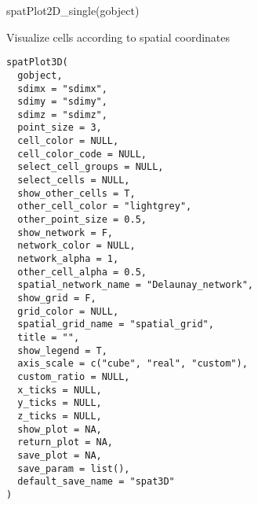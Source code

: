 \documentclass[a4paper]{book}
\begin{document}
%
\begin{Examples}
\begin{ExampleCode}
    spatPlot2D_single(gobject)
\end{ExampleCode}
\end{Examples}
%
\begin{Description}\relax
Visualize cells according to spatial coordinates
\end{Description}
%
\begin{Usage}
\begin{verbatim}
spatPlot3D(
  gobject,
  sdimx = "sdimx",
  sdimy = "sdimy",
  sdimz = "sdimz",
  point_size = 3,
  cell_color = NULL,
  cell_color_code = NULL,
  select_cell_groups = NULL,
  select_cells = NULL,
  show_other_cells = T,
  other_cell_color = "lightgrey",
  other_point_size = 0.5,
  show_network = F,
  network_color = NULL,
  network_alpha = 1,
  other_cell_alpha = 0.5,
  spatial_network_name = "Delaunay_network",
  show_grid = F,
  grid_color = NULL,
  spatial_grid_name = "spatial_grid",
  title = "",
  show_legend = T,
  axis_scale = c("cube", "real", "custom"),
  custom_ratio = NULL,
  x_ticks = NULL,
  y_ticks = NULL,
  z_ticks = NULL,
  show_plot = NA,
  return_plot = NA,
  save_plot = NA,
  save_param = list(),
  default_save_name = "spat3D"
)
\end{verbatim}
\end{Usage}
%
\end{document}
